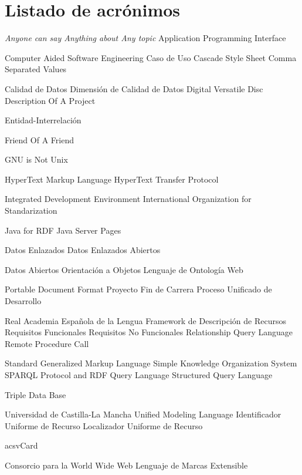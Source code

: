\chapter{Listado de acrónimos}
{\small
\begin{acronym}[XXXXXXXX]
       {\textit{Anyone can say Anything about Any topic}}
       {Application Programming Interface}

      {Computer Aided Software Engineering}
       {Caso de Uso}
       {Cascade Style Sheet}
       {Comma Separated Values}

        {Calidad de Datos}
       {Dimensión de Calidad de Datos}
       {Digital Versatile Disc}
      {Description Of A Project}

        {Entidad-Interrelación}

      {Friend Of A Friend}

       {\acs{GNU} is Not Unix}

      {HyperText Markup Language}
      {HyperText Transfer Protocol}

       {Integrated Development Environment}
       {International Organization for Standarization}

      {Java for \acs{RDF}}
       {Java Server Pages}

        {Datos Enlazados}
       {Datos Enlazados Abiertos}

        {Datos Abiertos}
        {Orientación a Objetos}
       {Lenguaje de Ontología Web}

       {Portable Document Format}
       {Proyecto Fin de Carrera}
       {Proceso Unificado de Desarrollo}

       {Real Academia Española de la Lengua}
       {Framework de Descripción de Recursos}
        {Requisitos Funcionales}
       {Requisitos No Funcionales}
       {Relationship Query Language}
       {Remote Procedure Call}

      {Standard Generalized Markup Language}
      {Simple Knowledge Organization System}
    {\acs{SPARQL} Protocol and RDF Query Language}
       {Structured Query Language}

       {Triple Data Base}

      {Universidad de Castilla-La Mancha}
       {Unified Modeling Language}
       {Identificador Uniforme de Recurso}
       {Localizador Uniforme de Recurso}

     {acs{vCard}}

       {Consorcio para la World Wide Web}
       {Lenguaje de Marcas Extensible}

\end{acronym}
}


